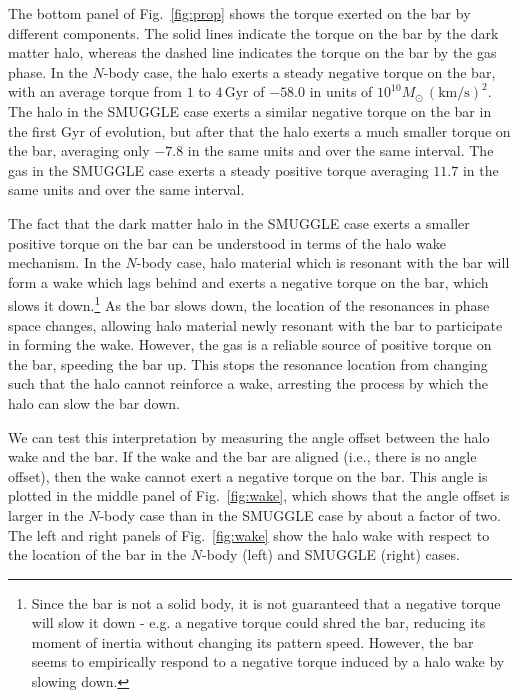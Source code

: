 \documentclass{natureprintstyle}
\newcommand{\Nbody}{$N$-body}
\begin{document}
The bottom panel of Fig.~\ref{fig:prop} shows the torque exerted on the bar by
different components. The solid lines indicate the torque on the bar by the
dark matter halo, whereas the dashed line indicates the torque on the bar by
the gas phase. In the \Nbody{} case, the halo exerts a steady negative torque on
the bar, with an average torque from $1$ to $4\,\textrm{Gyr}$ of $-58.0$ in
units of $10^{10}M_{\odot}\,(\textrm{km}/\textrm{s})^2$. The halo in the
SMUGGLE case exerts a similar negative torque on the bar in the first Gyr of
evolution, but after that the halo exerts a much smaller torque on the bar,
averaging only $-7.8$ in the same units and over the same interval. The gas in
the SMUGGLE case exerts a steady positive torque averaging $11.7$ in the same
units and over the same interval.

The fact that the dark matter halo in the SMUGGLE case exerts a smaller
positive torque on the bar can be understood in terms of the halo wake
mechanism. In the \Nbody{} case, halo material which is resonant with the bar
will form a wake which lags behind and exerts a negative torque on the bar,
which slows it down.\cite{1984MNRAS.209..729T, 1985MNRAS.213..451W,
1992ApJ...400...80H}\footnote{Since the bar is not a solid body, it is not
guaranteed that a negative torque will slow it down - e.g. a negative torque
could shred the bar, reducing its moment of inertia without changing its
pattern speed. However, the bar seems to empirically respond to a negative
torque induced by a halo wake by slowing down.} As the bar slows down, the
location of the resonances in phase space changes, allowing halo material
newly resonant with the bar to participate in forming the wake. However, the
gas is a reliable source of positive torque on the bar, speeding the bar up.
This stops the resonance location from changing such that the halo cannot
reinforce a wake, arresting the process by which the halo can slow the bar
down.

We can test this interpretation by measuring the angle offset between the halo
wake and the bar. If the wake and the bar are aligned (i.e., there is no angle
offset), then the wake cannot exert a negative torque on the bar. This angle
is plotted in the middle panel of Fig.~\ref{fig:wake}, which shows that the
angle offset is larger in the \Nbody{} case than in the SMUGGLE case by about a
factor of two. The left and right panels of Fig.~\ref{fig:wake} show the halo
wake with respect to the location of the bar in the \Nbody{} (left) and SMUGGLE
(right) cases.
\end{document}
